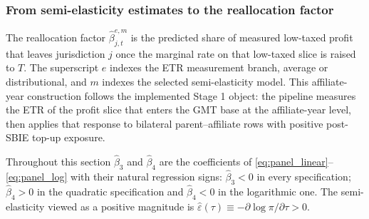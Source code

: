 \documentclass[11pt,a4paper]{article}
\begin{document}
\subsubsection{From semi-elasticity estimates to the reallocation factor}\label{sec:reallocation_mapping}

The reallocation factor $\hat{\beta}_{j,t}^{e,m}$ is the predicted share of measured low-taxed profit that leaves jurisdiction $j$ once the marginal rate on that low-taxed slice is raised to $T$. The superscript $e$ indexes the ETR measurement branch, average or distributional, and $m$ indexes the selected semi-elasticity model. This affiliate-year construction follows the implemented Stage 1 object: the pipeline measures the ETR of the profit slice that enters the GMT base at the affiliate-year level, then applies that response to bilateral parent--affiliate rows with positive post-SBIE top-up exposure.

Throughout this section $\hat{\beta}_3$ and $\hat{\beta}_4$ are the coefficients of \eqref{eq:panel_linear}--\eqref{eq:panel_log} with their natural regression signs: $\hat{\beta}_3<0$ in every specification; $\hat{\beta}_4>0$ in the quadratic specification and $\hat{\beta}_4<0$ in the logarithmic one. The semi-elasticity viewed as a positive magnitude is $\hat{\varepsilon}(\tau) \equiv -\partial \log \pi / \partial \tau > 0$.
\end{document}

